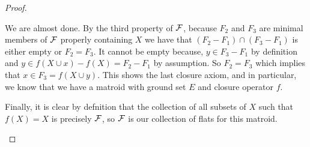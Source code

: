 \begin{proof}
\begin{enumerate}
     We are almost done. By the third property of $\mathcal{F}$, because $F_2$ and $F_3$ are minimal members of $\mathcal{F}$ properly containing $X$ we have that $(F_2-F_1)\cap (F_3 - F_1)$ is either empty or $F_2 = F_3$. It cannot be empty because, $y \in F_3 - F_1$ by definition and $y \in f(X\cup x)-f(X) = F_2 - F_1$ by assumption. So $F_2 = F_3$ which implies that $x \in F_3 = f(X \cup y).$ This shows the last closure axiom, and in particular, we know that we have a matroid with ground set $E$ and closure operator $f.$


     Finally, it is clear by defnition that the collection of all subsets of $X$ such that $f(X) = X$ is precisely $\mathcal{F}$, so $\mathcal{F}$ is our collection of flats for this matroid.
     
\end{enumerate}


    
\end{proof}
